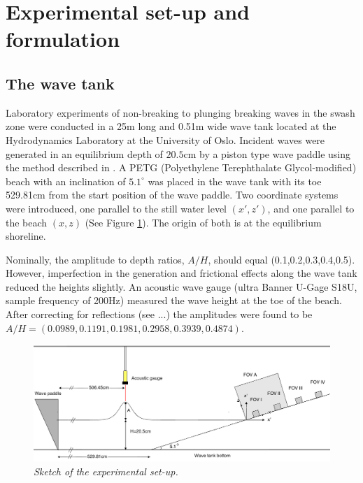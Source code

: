 \documentclass[a4paper, 11pt, english, twoside, openright]{article}
\begin{document}
\section{Experimental set-up and formulation}
\label{experimnetal-set-up}

\subsection{The wave tank}
Laboratory experiments of non-breaking to plunging breaking waves in the swash zone were conducted in  a 25m long and 0.51m wide wave tank 
located at the Hydrodynamics Laboratory at the University of Oslo.
Incident waves were generated in an equilibrium depth of $20.5$cm by
a piston type wave paddle using the method described in 
\cite{jensen2003experimental}. 
A PETG (Polyethylene Terephthalate Glycol-modified) beach with an inclination of $5.1^{\circ}$ was placed in the wave tank with its toe 529.81cm from the start position of the wave paddle.   Two coordinate systems were introduced, one parallel to the still water level $(x',z')$, and one parallel to the beach $(x,z)$ (See Figure \ref{fig:beach_tegning}).  The origin of both is at the equilibrium shoreline.

Nominally, the amplitude to depth ratios, $A/H$, should equal (0.1,0.2,0.3,0.4,0.5).  
However, imperfection in the generation and frictional effects along
the wave tank reduced the heights slightly.  
An acoustic wave gauge (ultra Banner U-Gage S18U, sample frequency of 200Hz) measured the wave height at the toe of the beach. After correcting for reflections (see ...) the amplitudes were found to be
  $A/H=(0.0989, 0.1191, 0.1981, 0.2958, 0.3939, 0.4874)$.


\begin{figure}[]
\centering
\includegraphics[width=\textwidth]{./Figures/setup3.png}
\caption{\textit{ Sketch of  the experimental set-up.}}
\label{fig:beach_tegning}
\end{figure}
\end{document}
